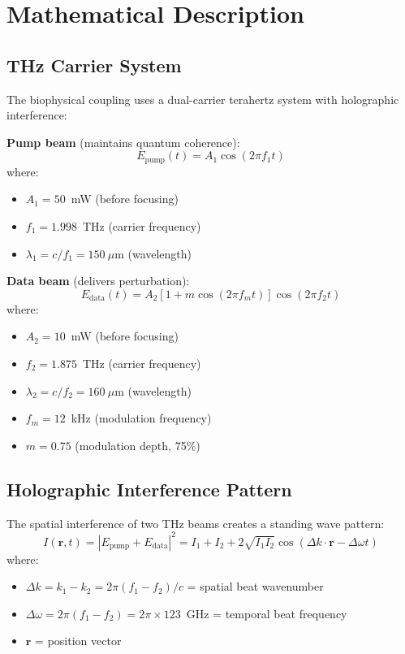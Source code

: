 \section{Mathematical Description}

\subsection{THz Carrier System}

The biophysical coupling uses a dual-carrier terahertz system with holographic interference:

\textbf{Pump beam} (maintains quantum coherence):
\begin{equation}
E_{\text{pump}}(t) = A_1 \cos(2\pi f_1 t)
\label{eq:pump-beam}
\end{equation}
where:
\begin{itemize}
\item $A_1 = 50$~mW (before focusing)
\item $f_1 = 1.998$~THz (carrier frequency)
\item $\lambda_1 = c/f_1 = 150~\mu$m (wavelength)
\end{itemize}

\textbf{Data beam} (delivers perturbation):
\begin{equation}
E_{\text{data}}(t) = A_2 [1 + m \cos(2\pi f_m t)] \cos(2\pi f_2 t)
\label{eq:data-beam}
\end{equation}
where:
\begin{itemize}
\item $A_2 = 10$~mW (before focusing)
\item $f_2 = 1.875$~THz (carrier frequency)
\item $\lambda_2 = c/f_2 = 160~\mu$m (wavelength)
\item $f_m = 12$~kHz (modulation frequency)
\item $m = 0.75$ (modulation depth, 75\%)
\end{itemize}

\subsection{Holographic Interference Pattern}

The spatial interference of two THz beams creates a standing wave pattern:
\begin{equation}
I(\mathbf{r}, t) = |E_{\text{pump}} + E_{\text{data}}|^2 = I_1 + I_2 + 2\sqrt{I_1 I_2}\cos(\Delta k \cdot \mathbf{r} - \Delta\omega t)
\label{eq:interference}
\end{equation}
where:
\begin{itemize}
\item $\Delta k = k_1 - k_2 = 2\pi(f_1 - f_2)/c$ = spatial beat wavenumber
\item $\Delta\omega = 2\pi(f_1 - f_2) = 2\pi \times 123$~GHz = temporal beat frequency
\item $\mathbf{r}$ = position vector
\end{itemize}


